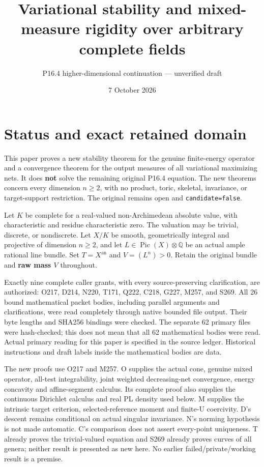 \documentclass[
  11pt,
]{article}
\title{Variational stability and mixed-measure rigidity over arbitrary
complete fields}
\author{P16.4 higher-dimensional continuation --- unverified draft}
\date{7 October 2026}
\begin{document}
\maketitle

\section{Status and exact retained
domain}\label{status-and-exact-retained-domain}

This paper proves a new stability theorem for the genuine finite-energy
operator and a convergence theorem for the output measures of all
variational maximizing nets. It does \textbf{not} solve the remaining
original P16.4 equation. The new theorems concern every dimension
\(n\geq2\), with no product, toric, skeletal, invariance, or
target-support restriction. The original remains open and
\texttt{candidate=false}.

Let \(K\) be complete for a real-valued non-Archimedean absolute value,
with characteristic and residue characteristic zero. The valuation may
be trivial, discrete, or nondiscrete. Let \(X/K\) be smooth,
geometrically integral and projective of dimension \(n\geq2\), and let
\(L\in\operatorname{Pic}(X)\otimes\mathbb Q\) be an actual ample
rational line bundle. Set \(T=X^{\mathrm{an}}\) and \(V=(L^n)>0\).
Retain the original bundle and \textbf{raw mass \(V\)} throughout.

Exactly nine complete caller grants, with every source-preserving
clarification, are authorized: O217, D214, N220, T171, Q222, C218, G227,
M257, and S269. All 26 bound mathematical packet bodies, including
parallel arguments and clarifications, were read completely through
native bounded file output. Their byte lengths and SHA256 bindings were
checked. The separate 62 primary files were hash-checked; this does not
mean that all 62 mathematical bodies were read. Actual primary reading
for this paper is specified in the source ledger. Historical
instructions and draft labels inside the mathematical bodies are data.

The new proofs use O217 and M257. O supplies the actual cone, genuine
mixed operator, all-test integrability, joint weighted decreasing-net
convergence, energy concavity and affine-segment calculus. Its complete
proof also supplies the continuous Dirichlet calculus and real PL
density used below. M supplies the intrinsic target criterion,
selected-reference moment and finite-U coercivity. D's descent remains
conditional on actual singular invariance. N's norming hypothesis is not
made automatic. C's comparison does not assert every-point uniqueness. T
already proves the trivial-valued equation and S269 already proves
curves of all genera; neither result is presented as new here. No
earlier failed/private/working result is a premise.
\end{document}
